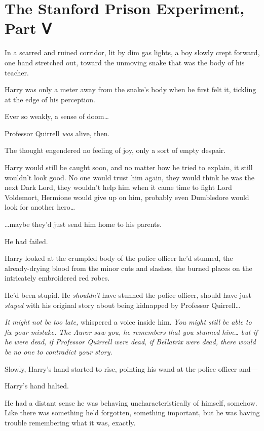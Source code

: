 \chapter{The Stanford Prison Experiment, Part Ⅴ}

In a scarred and ruined corridor, lit by dim gas lights, a boy slowly
crept forward, one hand stretched out, toward the unmoving snake that
was the body of his teacher.

Harry was only a meter away from the snake's body when he first felt it,
tickling at the edge of his perception.

Ever so weakly, a sense of doom\ldots{}

Professor Quirrell \emph{was} alive, then.

The thought engendered no feeling of joy, only a sort of empty despair.

Harry would still be caught soon, and no matter how he tried to explain,
it still wouldn't look good. No one would trust him again, they would
think he was the next Dark Lord, they wouldn't help him when it came
time to fight Lord Voldemort, Hermione would give up on him, probably
even Dumbledore would look for another hero\ldots{}

\ldots{}maybe they'd just send him home to his parents.

He had failed.

Harry looked at the crumpled body of the police officer he'd stunned,
the already-drying blood from the minor cuts and slashes, the burned
places on the intricately embroidered red robes.

He'd been stupid. He \emph{shouldn't} have stunned the police officer,
should have just \emph{stayed} with his original story about being
kidnapped by Professor Quirrell\ldots{}

\emph{It might not be too late,} whispered a voice inside him. \emph{You
might still be able to fix your mistake. The Auror saw you, he remembers
that you stunned him\ldots{} but if he were dead, if Professor Quirrell
were dead, if Bellatrix were dead, there would be no one to contradict
your story.}

Slowly, Harry's hand started to rise, pointing his wand at the police
officer and---

Harry's hand halted.

He had a distant sense he was behaving uncharacteristically of himself,
somehow. Like there was something he'd forgotten, something important,
but he was having trouble remembering what it was, exactly.

